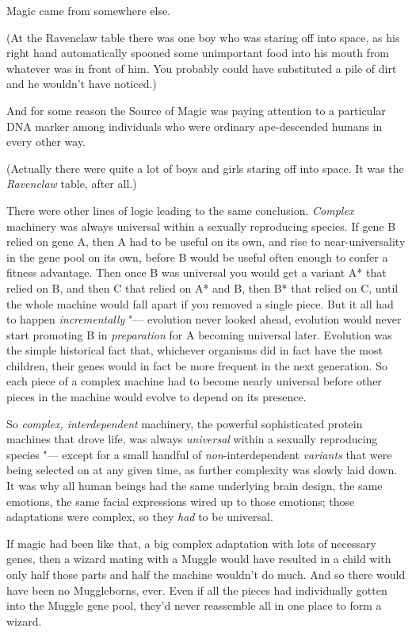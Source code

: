 Magic came from somewhere else.

(At the Ravenclaw table there was one boy who was staring off into
space, as his right hand automatically spooned some unimportant food
into his mouth from whatever was in front of him. You probably could
have substituted a pile of dirt and he wouldn't have noticed.)

And for some reason the Source of Magic was paying attention to a
particular DNA marker among individuals who were ordinary ape-descended
humans in every other way.

(Actually there were quite a lot of boys and girls staring off into
space. It was the \emph{Ravenclaw} table, after all.)

There were other lines of logic leading to the same conclusion.
\emph{Complex} machinery was always universal within a sexually
reproducing species. If gene B relied on gene A, then A had to be useful
on its own, and rise to near-universality in the gene pool on its own,
before B would be useful often enough to confer a fitness advantage.
Then once B was universal you would get a variant A* that relied on B,
and then C that relied on A* and B, then B* that relied on C, until the
whole machine would fall apart if you removed a single piece. But it all
had to happen \emph{incrementally} "--- evolution never looked ahead,
evolution would never start promoting B in \emph{preparation} for A
becoming universal later. Evolution was the simple historical fact that,
whichever organisms did in fact have the most children, their genes
would in fact be more frequent in the next generation. So each piece of
a complex machine had to become nearly universal before other pieces in
the machine would evolve to depend on its presence.

So \emph{complex, interdependent} machinery, the powerful sophisticated
protein machines that drove life, was always \emph{universal} within a
sexually reproducing species "--- except for a small handful of
\emph{non}-interdependent \emph{variants} that were being selected on at
any given time, as further complexity was slowly laid down. It was why
all human beings had the same underlying brain design, the same
emotions, the same facial expressions wired up to those emotions; those
adaptations were complex, so they \emph{had} to be universal.

If magic had been like that, a big complex adaptation with lots of
necessary genes, then a wizard mating with a Muggle would have resulted
in a child with only half those parts and half the machine wouldn't do
much. And so there would have been no Muggleborns, ever. Even if all the
pieces had individually gotten into the Muggle gene pool, they'd never
reassemble all in one place to form a wizard.

